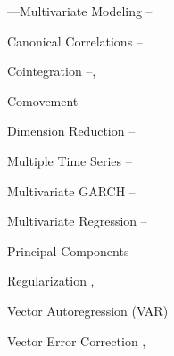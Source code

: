 \begin{minipage}{0.40\textwidth}
\noindent ---Multivariate Modeling \pageref{in:multimod1}--\pageref{in:multimod2}
	\begin{flushright}
	Canonical Correlations \pageref{in:cancor1}--\pageref{in:cancor2} \par
	Cointegration \pageref{in:coint1}--\pageref{in:coint2}, \pageref{in:coint3} \par
	Comovement \pageref{in:comove1}--\pageref{in:comove2} \par
	Dimension Reduction \pageref{in:dimred1}--\pageref{in:dimred2} \par
	Multiple Time Series \pageref{in:mts1}--\pageref{in:mts2} \par
	Multivariate GARCH \pageref{in:multgarch1}--\pageref{in:multgarch2} \par
	Multivariate Regression \pageref{in:multreg1}--\pageref{in:multreg2} \par
	Principal Components \pageref{in:pca} \par
	Regularization \pageref{in:regz1}, \pageref{in:regz2} \par
	Vector Autoregression (VAR) \pageref{in:var} \par
	Vector Error Correction \pageref{in:vec1}, \pageref{in:vec2} 
	\end{flushright}

\vfill
\end{minipage} \newpage
%
